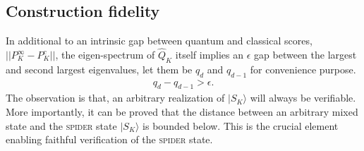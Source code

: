 \documentclass[%
 reprint,
superscriptaddress,
 amsmath,amssymb,
 aps,13pt
]{revtex4-2}
\begin{document}
\subsection{Construction fidelity}
In additional to an intrinsic gap between quantum and classical scores, $\vert\vert P^\infty_K-P^c_K\vert\vert$, the eigen-spectrum of $\hat{Q}_K$ itself implies an $\epsilon$ gap between the largest and second largest eigenvalues, let them be $q_d$ and $q_{d-1}$ for convenience purpose. 
\begin{align}
    q_d - q_{d-1} > \epsilon.
\end{align}
The observation is that, an arbitrary realization of $|S_K\rangle$ will always be verifiable. More importantly, it can be proved that the distance between an arbitrary mixed state and the \textsc{spider} state $|S_K\rangle$ is bounded below. This is the crucial element enabling faithful verification of the \textsc{spider} state.
\end{document}
